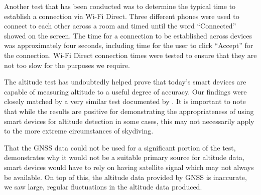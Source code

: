 Another test that has been conducted was to determine the typical time to establish a connection via Wi-Fi Direct. Three different phones were used to connect to each other across a room and timed until the word ``Connected'' showed on the screen. The time for a connection to be established across devices was approximately four seconds, including time for the user to click ``Accept'' for the connection. Wi-Fi Direct connection times were tested to ensure that they are not too slow for the purposes we require.

The altitude test has undoubtedly helped prove that today's smart devices are capable of measuring altitude to a useful degree of accuracy. Our findings were closely matched by a very similar test documented by \textcite{he_atmospheric_2012}. It is important to note that while the results are positive for demonstrating the appropriateness of using smart devices for altitude detection in some cases, this may not necessarily apply to the more extreme circumstances of skydiving.

That the GNSS data could not be used for a significant portion of the test, demonstrates why it would not be a suitable primary source for altitude data, smart devices would have to rely on having satellite signal which may not always be available. On top of this, the altitude data provided by GNSS is inaccurate, we saw large, regular fluctuations in the altitude data produced.
